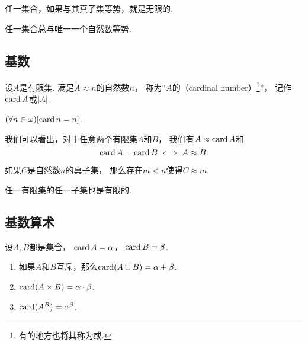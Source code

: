 \begin{corollary}
任一集合，如果与其真子集等势，就是无限的.
\end{corollary}

\begin{corollary}
任一集合总与唯一一个自然数等势.
\end{corollary}

\subsection{基数}
\begin{definition}
设\(A\)是有限集.
满足\(A \approx n\)的自然数\(n\)，
称为“\(A\)的（cardinal number）\footnote{%
有的地方也将其称为或.
}”，
记作\(\operatorname{card} A\)或\(\abs{A}\).
\end{definition}

\begin{example}
\((\forall n\in\omega)[\operatorname{card} n = n]\).
\end{example}

我们可以看出，对于任意两个有限集\(A\)和\(B\)，
我们有\(A \approx \operatorname{card} A\)和\[
	\operatorname{card} A = \operatorname{card} B
	\iff
	A \approx B.
\]


\begin{lemma}
如果\(C\)是自然数\(n\)的真子集，
那么存在\(m<n\)使得\(C \approx m\).
\end{lemma}

\begin{theorem}
任一有限集的任一子集也是有限的.
\end{theorem}

\subsection{基数算术}
\begin{definition}
设\(A,B\)都是集合，
\(\operatorname{card} A = \alpha\)，
\(\operatorname{card} B = \beta\).
\begin{enumerate}
	\item 如果\(A\)和\(B\)互斥，那么\(\operatorname{card}(A \cup B)=\alpha+\beta\).
	\item \(\operatorname{card}(A \times B)=\alpha\cdot\beta\).
	\item \(\operatorname{card}(A^B)=\alpha^\beta\).
\end{enumerate}
\end{definition}

